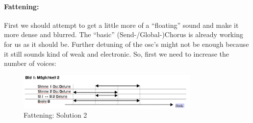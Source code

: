 \paragraph{Fattening:}
First we should attempt to get a little more of a ``floating'' sound and make it more dense and blurred. The ``basic'' (Send-/Global-)Chorus is already working for us as it should be. Further detuning of the osc's might not be enough because it still sounds kind of weak and electronic. So, first we need to increase the number of voices:
\bigskip %
%
\begin{figure}[ht!]
	\centering
	\includegraphics[width=90mm]{pics/vocal_workshop1_sol_2.png}
	\caption{Fattening: Solution 2}
	\label{vocal_1_sol_2}
\end{figure}
